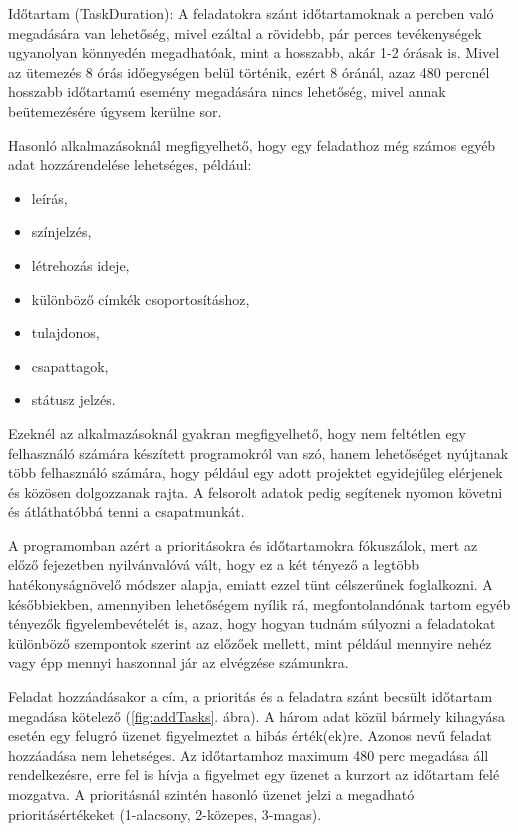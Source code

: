 Időtartam (TaskDuration): A feladatokra szánt időtartamoknak a percben való megadására van lehetőség, mivel ezáltal a rövidebb, pár perces tevékenységek ugyanolyan könnyedén megadhatóak, mint a hosszabb, akár 1-2 órásak is. Mivel az ütemezés 8 órás időegységen belül történik, ezért 8 óránál, azaz 480 percnél hosszabb időtartamú esemény megadására nincs lehetőség, mivel annak beütemezésére úgysem kerülne sor.

Hasonló alkalmazásoknál megfigyelhető, hogy egy feladathoz még számos egyéb adat hozzárendelése lehetséges, például:

\begin{itemize}
	\item leírás,
	\item színjelzés,
	\item létrehozás ideje,
	\item különböző címkék csoportosításhoz,
	\item tulajdonos,
	\item csapattagok,
	\item státusz jelzés.
\end{itemize}

Ezeknél az alkalmazásoknál gyakran megfigyelhető, hogy nem feltétlen egy felhasználó számára készített programokról van szó, hanem lehetőséget nyújtanak több felhasználó számára, hogy például egy adott projektet egyidejűleg elérjenek és közösen dolgozzanak rajta. A felsorolt adatok pedig segítenek nyomon követni és átláthatóbbá tenni a csapatmunkát.

A programomban azért a prioritásokra és időtartamokra fókuszálok, mert az előző fejezetben nyilvánvalóvá vált, hogy ez a két tényező a legtöbb hatékonyságnövelő módszer alapja, emiatt ezzel tünt célszerűnek foglalkozni. A későbbiekben, amennyiben lehetőségem nyílik rá, megfontolandónak tartom egyéb tényezők figyelembevételét is, azaz, hogy hogyan tudnám súlyozni a feladatokat különböző szempontok szerint az előzőek mellett, mint például mennyire nehéz vagy épp mennyi haszonnal jár az elvégzése számunkra. 


Feladat hozzáadásakor a cím, a prioritás és a feladatra szánt becsült időtartam megadása kötelező (\ref{fig:addTasks}. ábra). A három adat közül bármely kihagyása esetén egy felugró üzenet figyelmeztet a hibás érték(ek)re. Azonos nevű feladat hozzáadása nem lehetséges. Az időtartamhoz maximum 480 perc megadása áll rendelkezésre, erre fel is hívja a figyelmet egy üzenet a kurzort az időtartam felé mozgatva. A prioritásnál szintén hasonló üzenet jelzi a megadható prioritásértékeket (1-alacsony, 2-közepes, 3-magas).

